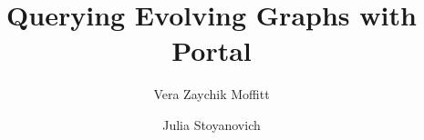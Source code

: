 \documentclass[twocolumn]{svjour3}
\begin{document}
\title{Querying Evolving Graphs with Portal}

\author{Vera Zaychik Moffitt \and Julia Stoyanovich}
%

\maketitle

\thispagestyle{empty}


%



%
%
%
%



\end{document}
